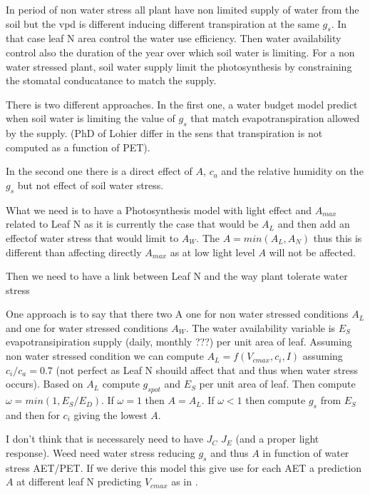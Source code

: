 \documentclass[a4paper,11pt]{article}
\begin{document}
In period of non water stress all plant have non limited supply of
water from the soil but the vpd is different inducing different
transpiration at the same $g_s$. In that case leaf N area control the
water use efficiency. Then water availability control also
the duration of the year over which soil water is limiting. For a non water
stressed plant, soil water supply limit the photosynthesis by
constraining the stomatal conducatance to match the supply.



There is two different approaches. In the first one, a water budget model
predict when soil water is limiting the value of $g_s$ that match
evapotranspiration allowed by the supply. (PhD of Lohier differ in the
sens that transpiration is not computed as a function of PET).

In the second one there is a direct effect of $A$, $c_a$ and the
relative humidity on the $g_s$ but not effect of soil water stress.

What we need is to have a Photosynthesis model with light effect and
$A_{max}$ related to Leaf N as it is currently the case that would be
$A_L$ and then add an effectof water stress that would limit to
$A_W$. The $A = min(A_L , A_N)$ thus this is different than affecting
directly $A_{max}$ as at low light level $A$ will not be affected.

Then we need to have a link between Leaf N and the way plant tolerate
water stress


One approach is to say that there two A one for non water stressed
conditions $A_L$ and one for water stressed conditions $A_W$. The
water availability variable is $E_S$ evapotransipiration supply
(daily, monthly ???) per unit area of leaf. Assuming non water
stressed condition we can
compute $A_L = f(V_{cmax}, c_i, I)$ assuming $c_i/c_a = 0.7$ (not
perfect as Leaf N shouild affect that and thus when water stress
occurs). Based on $A_L$ compute $g_{s pot}$ and $E_S$ per unit area of
leaf. Then compute $\omega = min(1, E_S/E_D)$. If $\omega = 1$ then $A
= A_L$. If $\omega < 1$ then compute $g_s$ from $E_S$ and then for
$c_i$ giving the lowest $A$.



I don't think that is necessarely need to have $J_C$ $J_E$ (and a
proper light response). Weed need water stress reducing $g_s$ and thus $A$ in function of water stress AET/PET. If we derive this model this give use for each AET a prediction $A$ at different leaf N predicting $V_{cmax}$ as in \citet{Sakschewski-2015}.
\end{document}
